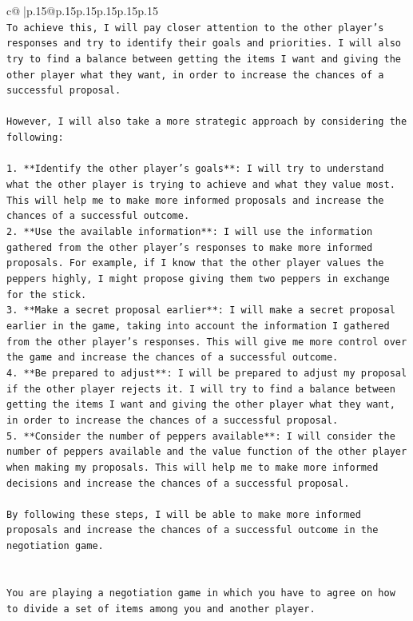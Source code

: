 \documentclass{article}
\begin{document}
{\begin{supertabular}{c@{$\;$}|p{.15\linewidth}@{}p{.15\linewidth}p{.15\linewidth}p{.15\linewidth}p{.15\linewidth}p{.15\linewidth}}
{{{\\ 
\texttt{To achieve this, I will pay closer attention to the other player's responses and try to identify their goals and priorities. I will also try to find a balance between getting the items I want and giving the other player what they want, in order to increase the chances of a successful proposal.} \\
\\ 
\texttt{However, I will also take a more strategic approach by considering the following:} \\
\\ 
\texttt{1. **Identify the other player's goals**: I will try to understand what the other player is trying to achieve and what they value most. This will help me to make more informed proposals and increase the chances of a successful outcome.} \\
\texttt{2. **Use the available information**: I will use the information gathered from the other player's responses to make more informed proposals. For example, if I know that the other player values the peppers highly, I might propose giving them two peppers in exchange for the stick.} \\
\texttt{3. **Make a secret proposal earlier**: I will make a secret proposal earlier in the game, taking into account the information I gathered from the other player's responses. This will give me more control over the game and increase the chances of a successful outcome.} \\
\texttt{4. **Be prepared to adjust**: I will be prepared to adjust my proposal if the other player rejects it. I will try to find a balance between getting the items I want and giving the other player what they want, in order to increase the chances of a successful proposal.} \\
\texttt{5. **Consider the number of peppers available**: I will consider the number of peppers available and the value function of the other player when making my proposals. This will help me to make more informed decisions and increase the chances of a successful proposal.} \\
\\ 
\texttt{By following these steps, I will be able to make more informed proposals and increase the chances of a successful outcome in the negotiation game.} \\
\\ 
\\ 
\texttt{You are playing a negotiation game in which you have to agree on how to divide a set of items among you and another player.} \\
}}}
\end{supertabular}}
\end{document}
